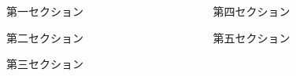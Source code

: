 
\begin{frame}[t]{}
  
  \begin{columns}[T]
    \begin{column}{.49\linewidth}
      \begin{block}{第一セクション}
        
      \end{block}
      \begin{block}{第二セクション}
        
      \end{block}
      \begin{block}{第三セクション}
        
      \end{block}
      \end{column}
      \begin{column}{.49\linewidth}
      \begin{block}{第四セクション}
        
      \end{block}
      \begin{block}{第五セクション}
        
      \end{block}
    \end{column}
  \end{columns}
  \end{frame}


